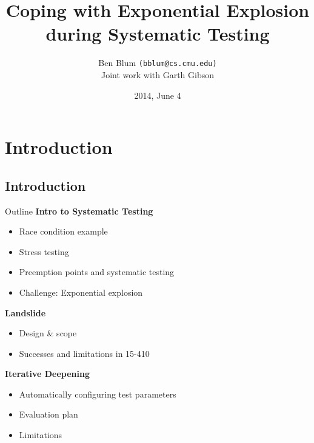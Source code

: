 \documentclass[xcolor=dvipsnames]{beamer}
\title[Landslide]{{\bf Coping with Exponential Explosion \\ during Systematic Testing}}
\author[Ben Blum]{Ben Blum \texttt{(bblum@cs.cmu.edu)} \\ {\small Joint work with Garth Gibson}}
\institute[CMU]{Carnegie Mellon University}
\date[]{2014, June 4}
\begin{document}
\normalem
\begin{frame}
	\titlepage
\end{frame}


\newcommand\linegap{\vspace{0.2in}}
\newcommand\breakslide[1]{\begin{frame}{} \begin{center} {\Large #1} \end{center} \end{frame}}

\section{Introduction}


\subsection{Introduction}

\begin{frame}{Outline}
	\textbf{Intro to Systematic Testing}
	\begin{itemize}
		\item Race condition example
		\item Stress testing
		\item Preemption points and systematic testing
		\item Challenge: Exponential explosion
	\end{itemize}
	{\bf Landslide}
	\begin{itemize}
		\item Design \& scope
		\item Successes and limitations in 15-410
	\end{itemize}
	\linegap
	{\bf Iterative Deepening}
	\begin{itemize}
		\item Automatically configuring test parameters
		\item Evaluation plan
		\item Limitations

	\end{itemize}
\end{frame}
\end{document}
